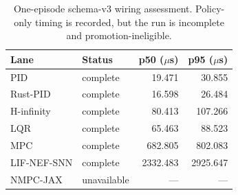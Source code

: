 \begin{table}[ht]
\centering
\caption{One-episode schema-v3 wiring assessment. Policy-only timing is recorded, but the run is incomplete and promotion-ineligible.}
\label{tab:wiring-latency}
\begin{tabular}{llrr}
\toprule
Lane & Status & p50 ($\mu$s) & p95 ($\mu$s) \\
\midrule
PID & complete & 19.471 & 30.855 \\
Rust-PID & complete & 16.598 & 26.484 \\
H-infinity & complete & 80.413 & 107.266 \\
LQR & complete & 65.463 & 88.523 \\
MPC & complete & 682.805 & 802.083 \\
LIF-NEF-SNN & complete & 2332.483 & 2925.647 \\
NMPC-JAX & unavailable & --- & --- \\
\bottomrule
\end{tabular}
\end{table}
